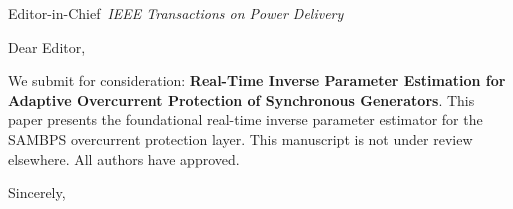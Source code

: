 \documentclass[11pt,a4paper]{letter}
\begin{document}
\begin{letter}{Editor-in-Chief\ \textit{IEEE Transactions on Power Delivery}}
\opening{Dear Editor,}
We submit for consideration: \textbf{Real-Time Inverse Parameter Estimation for Adaptive Overcurrent Protection of Synchronous Generators}.
This paper presents the foundational real-time inverse parameter estimator for the SAMBPS overcurrent protection layer.
This manuscript is not under review elsewhere. All authors have approved.
\closing{Sincerely,}
\end{letter}
\end{document}
